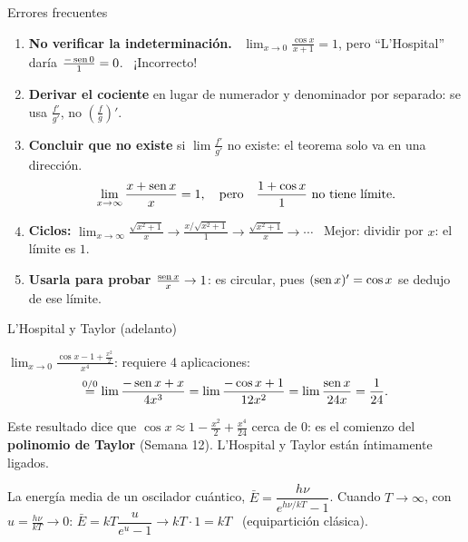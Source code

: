 \documentclass[10pt,aspectratio=169]{beamer}
\begin{document}
\begin{frame}{Errores frecuentes}
  \begin{enumerate}
    \item \textbf{No verificar la indeterminación.} \
      $\displaystyle\lim_{x\to0}\frac{\cos x}{x+1}=1$, pero ``L'Hospital'' daría $\frac{-\operatorname{sen}0}{1}=0$. \ \alert{¡Incorrecto!}
    \item \textbf{Derivar el cociente} en lugar de numerador y denominador por separado: se usa $\frac{f'}{g'}$, \alert{no} $\left(\frac fg\right)'$.
    \item \textbf{Concluir que no existe} si $\lim\frac{f'}{g'}$ no existe: el teorema solo va en una dirección.
      \[ \lim_{x\to\infty}\frac{x+\operatorname{sen} x}{x}=1,\quad\text{pero}\quad\frac{1+\cos x}{1}\ \text{no tiene límite.} \]
    \item \textbf{Ciclos:} $\displaystyle\lim_{x\to\infty}\frac{\sqrt{x^2+1}}{x}\to\frac{x/\sqrt{x^2+1}}{1}\to\frac{\sqrt{x^2+1}}{x}\to\cdots$ \
      Mejor: dividir por $x$: el límite es $1$.
    \item \textbf{Usarla para probar $\frac{\operatorname{sen} x}{x}\to1$}: es circular, pues $(\operatorname{sen} x)'=\cos x$ se dedujo de ese límite.
  \end{enumerate}
\end{frame}

\begin{frame}{L'Hospital y Taylor (adelanto)}
  \begin{ejemplo}[8]
    $\displaystyle\lim_{x\to0}\frac{\cos x-1+\frac{x^2}2}{x^4}$: requiere 4 aplicaciones:
    \[ \overset{0/0}{=}\lim\frac{-\operatorname{sen} x+x}{4x^3}=\lim\frac{-\cos x+1}{12x^2}=\lim\frac{\operatorname{sen} x}{24x}=\frac1{24}. \]
  \end{ejemplo}
  \begin{idea}
    Este resultado dice que $\cos x\approx1-\frac{x^2}2+\frac{x^4}{24}$ cerca de $0$: es el comienzo del \textbf{polinomio de Taylor}
    (Semana 12). L'Hospital y Taylor están íntimamente ligados.
  \end{idea}
  \begin{ejemplo}
    La energía media de un oscilador cuántico, $\bar E=\dfrac{h\nu}{e^{h\nu/kT}-1}$. Cuando $T\to\infty$, con $u=\frac{h\nu}{kT}\to0$:
    $\bar E=kT\dfrac{u}{e^u-1}\to kT\cdot1=kT$ \ (equipartición clásica).
  \end{ejemplo}
\end{frame}
\end{document}
